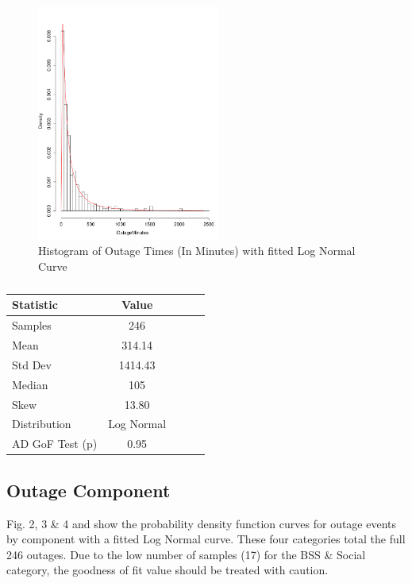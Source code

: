 \documentclass[conference]{IEEEtran}
\begin{document}
\begin{figure}
\begin{center}
\includegraphics[width=6cm]{graph1.pdf} 
\caption{ Histogram of Outage Times (In Minutes) with fitted Log Normal Curve}
\end{center}
\label{fig:outagedistribution}
\end{figure}


\begin {table}
\caption {}
\begin{center}
\begin{tabular}{l*{3}{c}r} Statistic & Value 
\\ \hline Samples & 246
\\ Mean & 314.14
\\ Std Dev & 1414.43
\\ Median & 105
\\ Skew & 13.80
\\ Distribution & Log Normal
\\AD GoF Test (p) & 0.95
\end{tabular}
\end{center}
\end{table}


\subsection{Outage Component}

Fig. 2, 3 \& 4 and show the probability density function curves for outage events by component with a fitted Log Normal curve. These four categories total the full 246 outages. Due to the low number of samples (17) for the BSS \& Social category, the goodness of fit value should be treated with caution. \par
\end{document}
